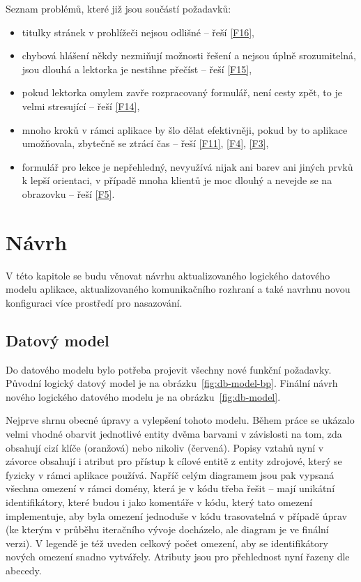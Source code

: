 Seznam problémů, které již jsou součástí požadavků:
\begin{itemize}
    \item titulky stránek v prohlížeči nejsou odlišné -- řeší \ref{F16},
    \item chybová hlášení někdy nezmiňují možnosti řešení a nejsou úplně srozumitelná, jsou dlouhá a lektorka je nestihne přečíst -- řeší \ref{F15},
    \item pokud lektorka omylem zavře rozpracovaný formulář, není cesty zpět, to je velmi stresující -- řeší \ref{F14},
    \item mnoho kroků v rámci aplikace by šlo dělat efektivněji, pokud by to aplikace umožňovala, zbytečně se ztrácí čas -- řeší \ref{F11}, \ref{F4}, \ref{F3},
    \item formulář pro lekce je nepřehledný, nevyužívá nijak ani barev ani jiných prvků k lepší orientaci, v případě mnoha klientů je moc dlouhý a nevejde se na obrazovku -- řeší \ref{F5}.
\end{itemize}

\chapter{Návrh}\label{chap:navrh}

V této kapitole se budu věnovat návrhu aktualizovaného logického datového modelu aplikace, aktualizovaného komunikačního rozhraní a také navrhnu novou konfiguraci více prostředí pro nasazování.


\section{Datový model}

Do datového modelu bylo potřeba projevit všechny nové funkční požadavky. Původní logický datový model je na obrázku~\ref{fig:db-model-bp}. Finální návrh nového logického datového modelu je na obrázku~\ref{fig:db-model}.

Nejprve shrnu obecné úpravy a vylepšení tohoto modelu. Během práce se ukázalo velmi vhodné obarvit jednotlivé entity dvěma barvami v závislosti na tom, zda obsahují cizí klíče (oranžová) nebo nikoliv (červená). Popisy vztahů nyní v závorce obsahují i atribut pro přístup k cílové entitě z entity zdrojové, který se fyzicky v rámci aplikace používá. Napříč celým diagramem jsou pak vypsaná všechna omezení v rámci domény, která je v kódu třeba řešit -- mají unikátní identifikátory, které budou i jako komentáře v kódu, který tato omezení implementuje, aby byla omezení jednoduše v kódu trasovatelná v případě úprav (ke kterým v průběhu iteračního vývoje docházelo, ale diagram je ve finální verzi). V legendě je též uveden celkový počet omezení, aby se identifikátory nových omezení snadno vytvářely. Atributy jsou pro přehlednost nyní řazeny dle abecedy.

